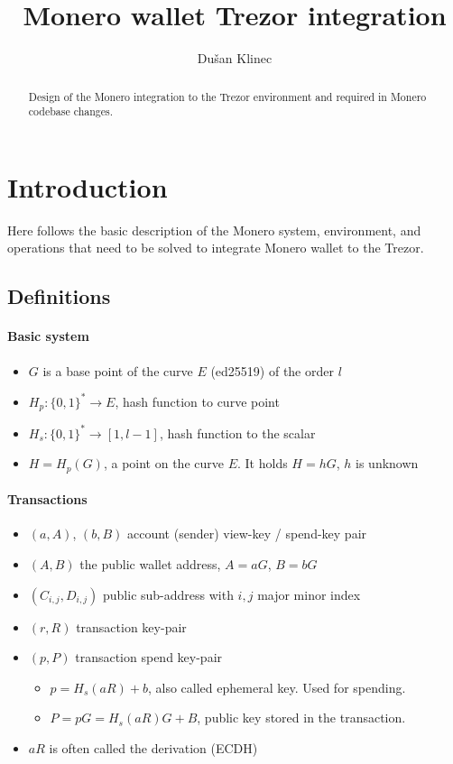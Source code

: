 \documentclass[]{article}
\title{Monero wallet Trezor integration}
\author{Du\v{s}an Klinec}
\begin{document}
	
\maketitle

\begin{abstract}
	Design of the Monero integration to the Trezor environment and required in Monero codebase changes.
\end{abstract}

\section{Introduction}
Here follows the basic description of the Monero system, environment, and operations that need to be solved to integrate Monero wallet to the Trezor.

\subsection{Definitions}

\paragraph{Basic system}

\begin{itemize}
	\item $G$ is a base point of the curve $E$ (ed25519) of the order $l$
	\item $H_p : \{0,1\}^* \rightarrow E$, hash function to curve point
	\item $H_s : \{0,1\}^* \rightarrow [1, l-1]$, hash function to the scalar
	\item $H = H_p(G)$, a point on the curve $E$. It holds $H=hG$, $h$ is unknown
	
\end{itemize}

\paragraph{Transactions}

\begin{itemize}
	\item $(a, A)$, $(b, B)$ account (sender) view-key / spend-key pair
	\item $(A, B)$ the public wallet address, $A=aG$, $B=bG$
	\item $(C_{i,j}, D_{i,j})$ public sub-address with $i, j$ major minor index
	\item $(r, R)$ transaction key-pair 
	\item $(p, P)$ transaction spend key-pair
	\begin{itemize}
		\item $p = H_s(aR) + b$, also called ephemeral key. Used for spending.
		\item $P = pG = H_s(aR)G + B$, public key stored in the transaction.
	\end{itemize}
	\item $aR$ is often called the derivation (ECDH)
\end{itemize}
\end{document}
